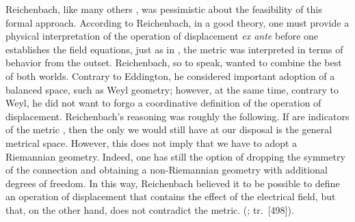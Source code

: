 \documentclass[submitted]{article}
\renewcommand{\rzlap}[2]{(\cite[#1]{Reichenbach1928}; tr.\ [#2])\xspace}
\begin{document}

%


Reichenbach, like many others , was pessimistic about the feasibility of this formal approach. According to Reichenbach, in a good theory, one must provide a physical interpretation of the operation of displacement \emph{ex ante} before one establishes the field equations, just as in \gr, the metric was interpreted in terms of \rac behavior from the outset. Reichenbach, so to speak, wanted to combine the best of both worlds. Contrary to Eddington, he considered important adoption of a balanced space, such as Weyl geometry; however, at the same time, contrary to Weyl, he did not want to forgo a coordinative definition of the operation of displacement. Reichenbach's reasoning was roughly the following. If \rac are indicators of the metric \gmn, then the only  we would still have at our disposal is the general metrical space. However, this does not imply that we have to adopt a Riemannian geometry. Indeed, one has still the option of dropping the symmetry of the connection \asym and obtaining a non-Riemannian geometry with additional degrees of freedom. In this way, Reichenbach believed it to be possible to define an operation of displacement that contains the effect of the electrical field, but that, on the other hand, does not contradict the metric.  \rzlap{357}{498}. 
\end{document}
